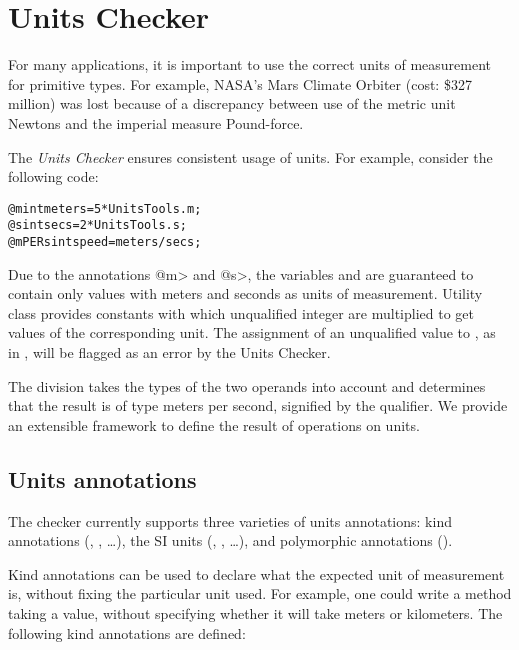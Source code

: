 \htmlhr
\chapter{Units Checker\label{units-checker}}

For many applications, it is important to use the correct units of
measurement for primitive types.  For example, NASA's Mars Climate Orbiter
(cost: \$327 million) was lost because of a discrepancy between use
of the metric unit Newtons and the imperial measure Pound-force.

The \emph{Units Checker} ensures consistent usage of units.
For example, consider the following code:

\begin{alltt}
@m int meters = 5 * UnitsTools.m;
@s int secs = 2 * UnitsTools.s;
@mPERs int speed = meters / secs;
\end{alltt}

Due to the annotations \<@m> and \<@s>, the variables  and  are guaranteed to contain
only values with meters and seconds as units of measurement.
Utility class  provides constants with which
unqualified integer are multiplied to get values of the corresponding unit.
The assignment of an unqualified value to , as in
, will be flagged as an error by the Units Checker.

The division  takes the types of the two operands
into account and determines that the result is of type
meters per second, signified by the  qualifier.
We provide an extensible framework to define the result of operations
on units.


\section{Units annotations\label{units-annotations}}

The checker currently supports three varieties of units annotations:
kind annotations (,
, \dots),
the SI units (, , \dots), and polymorphic annotations
().


Kind annotations can be used to declare what the expected unit of
measurement is, without fixing the particular unit used.
For example, one could write a method taking a  value,
without specifying whether it will take meters or kilometers.
The following kind annotations are defined:

